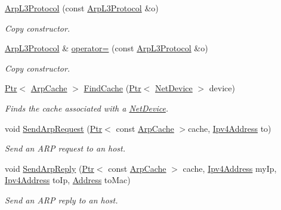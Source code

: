 \begin{DoxyCompactItemize}
\item 
\hyperlink{classns3_1_1ArpL3Protocol_a6078c7624ad881b99b9978e09120e9eb}{Arp\+L3\+Protocol} (const \hyperlink{classns3_1_1ArpL3Protocol}{Arp\+L3\+Protocol} \&o)
\begin{DoxyCompactList}\small\item\em Copy constructor. \end{DoxyCompactList}\item 
\hyperlink{classns3_1_1ArpL3Protocol}{Arp\+L3\+Protocol} \& \hyperlink{classns3_1_1ArpL3Protocol_a946112f849f17835faa7e3b017fc6dc6}{operator=} (const \hyperlink{classns3_1_1ArpL3Protocol}{Arp\+L3\+Protocol} \&o)
\begin{DoxyCompactList}\small\item\em Copy constructor. \end{DoxyCompactList}\item 
\hyperlink{classns3_1_1Ptr}{Ptr}$<$ \hyperlink{classns3_1_1ArpCache}{Arp\+Cache} $>$ \hyperlink{classns3_1_1ArpL3Protocol_a428dd13241d63395a5efbe68d6d9e667}{Find\+Cache} (\hyperlink{classns3_1_1Ptr}{Ptr}$<$ \hyperlink{classns3_1_1NetDevice}{Net\+Device} $>$ device)
\begin{DoxyCompactList}\small\item\em Finds the cache associated with a \hyperlink{classns3_1_1NetDevice}{Net\+Device}. \end{DoxyCompactList}\item 
void \hyperlink{classns3_1_1ArpL3Protocol_a9fe6faf0f82536ba2c14d5bdbf7469db}{Send\+Arp\+Request} (\hyperlink{classns3_1_1Ptr}{Ptr}$<$ const \hyperlink{classns3_1_1ArpCache}{Arp\+Cache} $>$cache, \hyperlink{classns3_1_1Ipv4Address}{Ipv4\+Address} to)
\begin{DoxyCompactList}\small\item\em Send an A\+RP request to an host. \end{DoxyCompactList}\item 
void \hyperlink{classns3_1_1ArpL3Protocol_a2e1f058ec7982637902e91cb2e63b12c}{Send\+Arp\+Reply} (\hyperlink{classns3_1_1Ptr}{Ptr}$<$ const \hyperlink{classns3_1_1ArpCache}{Arp\+Cache} $>$ cache, \hyperlink{classns3_1_1Ipv4Address}{Ipv4\+Address} my\+Ip, \hyperlink{classns3_1_1Ipv4Address}{Ipv4\+Address} to\+Ip, \hyperlink{classns3_1_1Address}{Address} to\+Mac)
\begin{DoxyCompactList}\small\item\em Send an A\+RP reply to an host. \end{DoxyCompactList}\end{DoxyCompactItemize}
